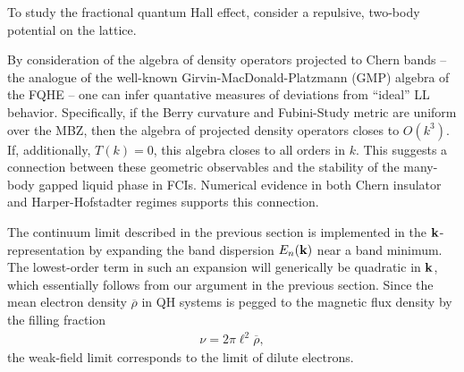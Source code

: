 \documentclass[aps,prb,twocolumn,letterpaper,twoside,nobalancelastpage,groupedaddress,amsmath,amssymb,floatfix,citeautoscript]{revtex4-1}
\begin{document}

To study the fractional quantum Hall effect, consider a repulsive, two-body potential on the lattice.


By consideration of the algebra of density operators projected to Chern bands -- the analogue of the well-known Girvin-MacDonald-Platzmann (GMP) algebra of the FQHE \cite{Girvin:1986bu} -- one can infer quantative measures of deviations from ``ideal'' LL behavior\cite{parameswaran_fractional_2012,roy_band_2014}. Specifically, if the Berry curvature and Fubini-Study metric are uniform over the MBZ, then the algebra of projected density operators closes to $O(k^3)$. If, additionally, $T(k)=0$, this algebra closes to all orders in $k$. This suggests a connection between these geometric observables and the stability of the many-body gapped liquid phase in FCIs. Numerical evidence in both Chern insulator\cite{jackson_geometric_2015} and Harper-Hofstadter\cite{bauer_quantum_2016} regimes supports this connection.


The continuum limit described in the previous section is implemented in the ${\bf k}$-representation by expanding the band dispersion $E_{n}({\bf k})$ near a band minimum. The lowest-order term in such an expansion will generically be quadratic in ${\bf k}$, which essentially follows from our argument in the previous section. Since the mean electron density $\overline{\rho}$ in QH systems is pegged to the magnetic flux density by the filling fraction
\begin{align*}
\nu = 2\pi \ell^2 \overline{\rho},
\end{align*}
the weak-field limit corresponds to the limit of dilute electrons.  

\end{document}
